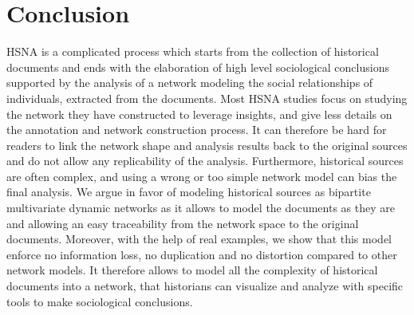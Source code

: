 \documentclass{vgtc}                          %
\newcommand{\modelplural}{bipartite multivariate dynamic networks\xspace}
\begin{document}
\section{Conclusion}

HSNA is a complicated process which starts from the collection of historical documents and ends with the elaboration of high level sociological conclusions supported by the analysis of a network modeling the social relationships of individuals, extracted from the documents. 
Most HSNA studies focus on studying the network they have constructed to leverage insights, and give less details on the annotation and network construction process. It can therefore be hard for readers to link the network shape and analysis results back to the original sources and do not allow any replicability of the analysis. Furthermore, historical sources are often complex, and using a wrong or too simple network model can bias the final analysis.
We argue in favor of modeling historical sources as \modelplural as it allows to model the documents as they are and allowing an easy traceability from the network space to the original documents.
Moreover, with the help of real examples, we show that this model enforce no information loss, no duplication and no distortion compared to other network models. It therefore allows to model all the complexity of historical documents into a network, that historians can visualize and analyze with specific tools to make sociological conclusions.




%

%
%
%


\end{document}
